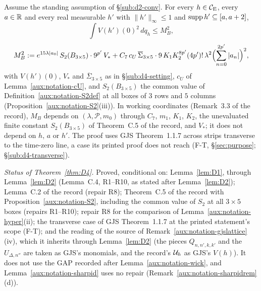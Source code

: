 \begin{dtheorem}\label{thm:D4}
Assume the standing assumption of \S\ref{sub:d2-conv}.  For every $h\in\mathcal{C}_{\mathrm E}$, every $a\in\mathbb{R}$ and
every real measurable $h'$ with $\|h'\|_\infty\le1$ and $\operatorname{supp} h'\subseteq[a,a+2]$,
\[
 \int V(h')(0)^2\,dq_h\le M_B^2 ,
\]
\[
 M_B^2:=e^{15\lambda|a_0|}\,S_2(B_{3\times5})\cdot9^{p'}\,V_*
 +C_7\,c_U\,\overline\Sigma_{3\times5}\cdot9\,K_1K_2^{8p'}(4p')!\,\lambda^2
 \Bigl(\sum_{n=0}^{2p'}|a_n|\Bigr)^2 ,
\]
with $V(h')(0)$, $V_*$ and $\overline\Sigma_{3\times5}$ as in \S\ref{sub:d4-setting}, $c_U$ of
Lemma~\ref{aux:notation-cU}, and $S_2(B_{3\times5})$ the common value of
Definition~\ref{aux:notation-S2def} at all boxes of $3$ rows and $5$ columns
(Proposition~\ref{aux:notation-S2}(iii)).  In working coordinates (Remark~3.3 of the record), $M_B$
depends on $(\lambda,\mathscr P,m_0)$ through $C_7$, $m_1$, $K_1$, $K_2$, the unevaluated finite
constant $S_2(B_{3\times5})$ of Theorem~C.5 of the record, and $V_*$; it does not depend on $h$, $a$
or $h'$.  The proof uses GJS Theorem~1.1.7 across strips transverse to the time-zero line, a case
its printed proof does not reach (F-T, \S\ref{sec:purpose}; \S\ref{sub:d4-transverse}).
\end{dtheorem}

\emph{Status of Theorem~\ref{thm:D4}.}  Proved, conditional on: Lemma~\ref{lem:D1}, through
Lemma~\ref{lem:D2} (Lemma~C.4, R1--R10, as stated after Lemma~\ref{lem:D2});
Lemma~C.2 of the record (repair R8); Theorem~C.5 of the record with
Proposition~\ref{aux:notation-S2}, including the common value of $S_2$ at all $3\times5$ boxes
(repairs R1--R10); repair R8 for the comparison of Lemma~\ref{aux:notation-hyper}(ii); the
transverse case of GJS Theorem~1.1.7 at the printed statement's scope (F-T); and the reading of the
source of Remark~\ref{aux:notation-gjslattice}(iv), which it inherits through Lemma~\ref{lem:D2}
(the pieces $Q_{n,n',k,k'}$ and the $U_{\Delta,n''}$ are taken as GJS's monomials, and the record's
$\mathcal U_h$ as GJS's $V(h)$).  It does not use the
GAP recorded after Lemma~\ref{aux:notation-wick}, and Lemma~\ref{aux:notation-sharpid} uses no
repair (Remark~\ref{aux:notation-sharpidrem}(d)).

